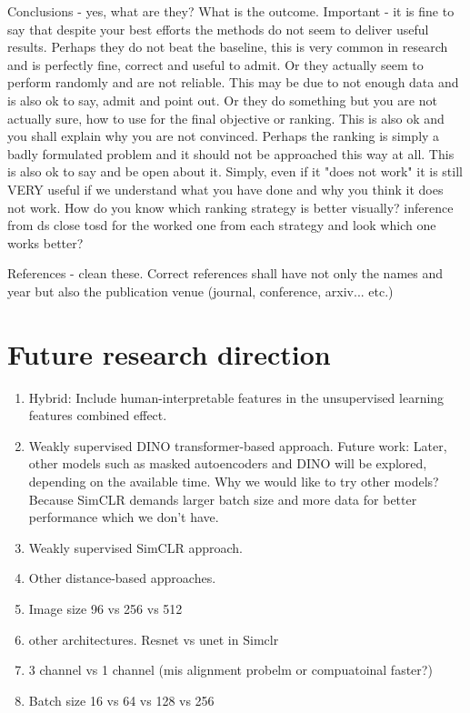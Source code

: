 	Conclusions - yes, what are they? What is the outcome. Important - it is fine to say that despite your best efforts the methods do not seem to
	 deliver useful results. Perhaps they do not beat the baseline, this is very common in research and is perfectly fine, correct and useful to admit.
	  Or they actually seem to perform randomly and are not reliable. This may be due to not enough data and is also ok to say, admit and point out. Or 
	  they do something but you are not actually sure, how to use for the final objective or ranking. This is also ok and you shall explain why you are 
	  not convinced. Perhaps the ranking is simply a badly formulated problem and it should not be approached this way at all. This is also ok to say and 
	  be open about it. Simply, even if it "does not work" it is still VERY useful if we understand what you have done and why you think it does not work.	
How do you know which ranking strategy is better visually? inference from ds close tosd for the worked one from each strategy and look which one works 
better?

References - clean these. Correct references shall have not only the names and year but also the publication venue (journal, conference, arxiv... etc.)

\section{Future research direction}

\begin{enumerate}
    \item Hybrid: Include human-interpretable features in the unsupervised learning features combined effect.
    \item Weakly supervised DINO transformer-based approach. Future work: Later, other models such as masked autoencoders and DINO will be explored, depending on the available time.
	Why we would like to try other models? Because SimCLR demands larger batch size and more data for better performance which we don't have.
    \item Weakly supervised SimCLR approach.
    \item Other distance-based approaches.
    \item Image size 96 vs 256 vs 512
    \item other architectures. Resnet vs unet in Simclr
    \item 3 channel vs 1 channel (mis alignment probelm or compuatoinal faster?)
    \item Batch size 16 vs 64 vs 128 vs 256
\end{enumerate}